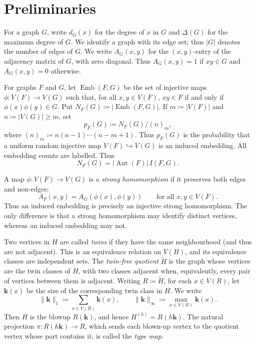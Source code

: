\documentclass[10pt]{article}
\theoremstyle{plain}
\theoremstyle{remark}
\DeclareMathOperator{\Aut}{Aut}
\DeclareMathOperator{\Emb}{Emb}
\begin{document}
\section{Preliminaries}
\label{sec:notation}

For a graph $G$, write $d_G(x)$ for the degree of $x$ in $G$ and $\Delta(G)$ for the maximum degree of $G$.
We identify a graph with its edge set; thus $|G|$ denotes the number of edges of $G$.
We write $A_G(x,y)$ for the $(x,y)$-entry of the adjacency matrix of $G$, with zero diagonal. Thus $A_G(x,y)=1$ if $xy\in G$ and $A_G(x,y)=0$ otherwise.

For graphs $F$ and $G$, let $\Emb(F,G)$ be the set of injective maps $\phi:V(F)\to V(G)$ such that, for all $x,y\in V(F)$, $xy\in F$ if and only if $\phi(x)\phi(y)\in G$.
Put $N_F(G)\coloneqq|\Emb(F,G)|$. If $m\coloneqq |V(F)|$ and $n\coloneqq |V(G)|\ge m$, set
\[
        p_F(G)\coloneqq {N_F(G)}/{(n)_m},
\]
where $(n)_m\coloneqq n(n-1)\cdots(n-m+1)$. Thus $p_F(G)$ is the probability that a uniform random injective map $V(F)\hookrightarrow V(G)$ is an induced embedding.
All embedding counts are labelled. Thus
\[
        N_F(G)=|\Aut(F)|\,I(F,G).
\]

A map $\phi:V(F)\to V(G)$ is a \emph{strong homomorphism} if it preserves both edges and non-edges:
\[
        A_F(x,y)=A_G(\phi(x),\phi(y))
        \qquad\text{for all }x,y\in V(F).
\]
Thus an induced embedding is precisely an injective strong homomorphism. The only difference is that a strong homomorphism may identify distinct vertices, whereas an induced embedding may not.

Two vertices in $H$ are called \emph{twins} if they have the same neighbourhood (and thus are not adjacent). This is an equivalence relation on $V(H)$, and its equivalence classes are independent sets. The \emph{twin-free quotient} $\widetilde H$ is the graph whose vertices are the twin classes of $H$, with two classes adjacent when, equivalently, every pair of vertices between them is adjacent.
Writing $R\coloneqq\widetilde H$, for each $x\in V(R)$, let $\mathbf k(x)$ be the size of the corresponding twin class in $H$. We write
\[
        \|\mathbf k\|_1\coloneqq\sum_{x\in V(R)}\mathbf k(x),
        \qquad
        \|\mathbf k\|_\infty\coloneqq\max_{x\in V(R)}\mathbf k(x).
\]
Then $H$ is the blowup $R(\mathbf k)$, and hence $H^{(h)}=R(h\mathbf k)$.
The natural projection $\pi:R(h\mathbf k)\to R$, which sends each blown-up vertex to the quotient vertex whose part contains it, is called the \emph{type map}.
\end{document}
